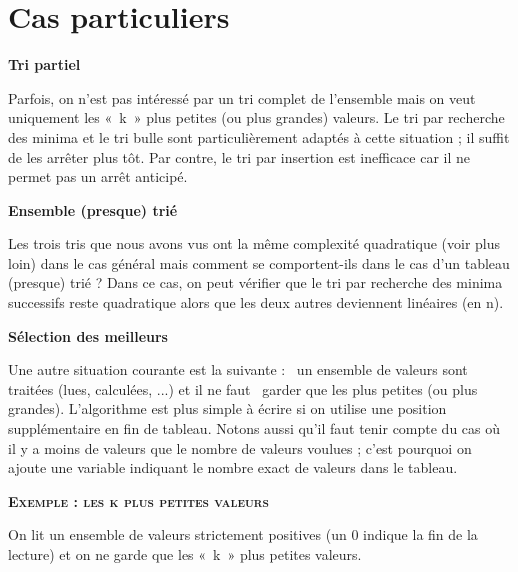 	\section{Cas particuliers}
	
		{\sffamily\bfseries\upshape
		Tri partiel}

			Parfois, on n’est pas intéressé par un tri complet de l’ensemble mais on
			veut uniquement les «~k~» plus petites (ou plus grandes) valeurs. Le
			tri par recherche des minima et le tri bulle sont particulièrement
			adaptés à cette situation ; il suffit de les arrêter plus tôt. Par
			contre, le tri par insertion est inefficace car il ne permet pas un
			arrêt anticipé.

		{\sffamily\bfseries\upshape
		Ensemble (presque) trié}

			Les trois tris que nous avons vus ont la même complexité quadratique
			(voir plus loin) dans le cas général mais comment se comportent-ils
			dans le cas d’un tableau (presque) trié ? Dans ce cas, on peut vérifier
			que le tri par recherche des minima successifs reste quadratique alors
			que les deux autres deviennent linéaires (en n).

		{\sffamily\bfseries\upshape
		Sélection des meilleurs}

			Une autre situation courante est la suivante : \ un ensemble de valeurs
			sont traitées (lues, calculées, ...) et il ne faut \ garder que les
			 plus petites (ou plus grandes).
			L'algorithme est plus simple à écrire si on utilise
			une position supplémentaire en fin de tableau. Notons aussi qu’il faut
			tenir compte du cas où il y a moins de valeurs que le nombre de valeurs
			voulues ; c’est pourquoi on ajoute une variable indiquant le nombre
			exact de valeurs dans le tableau.

		{\sffamily\bfseries\scshape
		Exemple : les k plus petites valeurs}

			On lit un ensemble de valeurs strictement positives (un 0 indique la fin
			de la lecture) et on ne garde que les «~k~» plus petites valeurs.

			\bigskip
			
			
